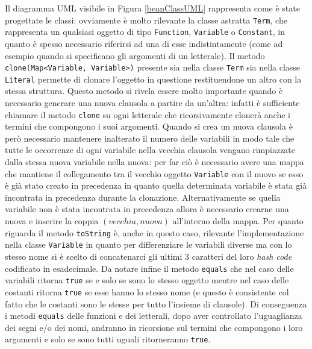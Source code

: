 \documentclass[a4paper,11pt]{article}
\begin{document}
Il diagramma UML visibile in Figura \ref{beanClassUML} rappresenta come è state progettate le classi: ovviamente è molto rilevante la classe astratta \texttt{Term}, che rappresenta un qualsiasi oggetto di tipo \texttt{Function}, \texttt{Variable} o \texttt{Constant}, in quanto è spesso necessario riferirsi ad una di esse indistintamente (come ad esempio quando si specificano gli argomenti di un letterale). Il metodo \texttt{clone(Map<Variable, Variable>)} presente sia nella classe \texttt{Term} sia nella classe \texttt{Literal} permette di clonare l'oggetto in questione restituendone un altro con la stessa struttura. Questo metodo si rivela essere molto importante quando è necessario generare una nuova clausola a partire da un'altra: infatti è sufficiente chiamare il metodo \texttt{clone} su ogni letterale che ricorsivamente clonerà anche i termini che compongono i suoi argomenti. Quando si crea un nuova clausola è però necessario mantenere inalterato il numero delle variabili in modo tale che tutte le occorrenze di ogni variabile nella vecchia clausola vengano rimpiazzate dalla stessa nuova variabile nella nuova: per far ciò è necessario avere una mappa che mantiene il collegamento tra il vecchio oggetto \texttt{Variable} con il nuovo se esso è già stato creato in precedenza in quanto quella determinata variabile è stata già incontrata in precedenza durante la clonazione. Alternativamente se quella variabile non è stata incontrata in precedenza allora è necessario crearne una nuova e inserire la coppia $(vecchia, nuova)$ all'interno della mappa.
Per quanto riguarda il metodo \texttt{toString} è, anche in questo caso, rilevante l'implementazione nella classe \texttt{Variable} in quanto per differenziare le variabili diverse ma con lo stesso nome si è scelto di concatenarci gli ultimi 3 caratteri del loro \emph{hash code} codificato in esadecimale.
Da notare infine il metodo \texttt{equals} che nel caso delle variabili ritorna \texttt{true} se e solo se sono lo stesso oggetto mentre nel caso delle costanti ritorna \texttt{true} se esse hanno lo stesso nome (e questo è consistente col fatto che le costanti sono le stesse per tutto l'insieme di clausole). Di conseguenza i metodi \texttt{equals} delle funzioni e dei letterali, dopo aver controllato l'uguaglianza dei segni e/o dei nomi, andranno in ricorsione sul termini che compongono i loro argomenti e solo se sono tutti uguali ritorneranno \texttt{true}.
\end{document}

